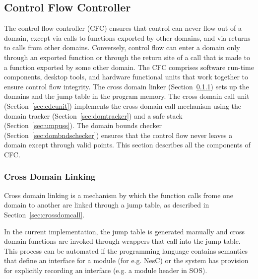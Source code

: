 \subsection{Control Flow Controller}
\label{sec:cfctrl}
%
The control flow controller (CFC) ensures that control can never flow out of
a domain, except via calls to functions exported by other domains, and
via returns to calls from other domains.
%
Conversely, control flow can enter a domain only through an exported
function or through the return site of a call that is made to a
function exported by some other domain.
%
%
The CFC comprises software run-time components, desktop tools, and
hardware functional units that work together to ensure control flow
integrity.
%
The cross domain linker (Section~\ref{sec:cross_domain_linking}) sets up the domains and the jump table in the program memory.
%
The cross domain call unit (Section~\ref{sec:cdcunit}) implements the
cross domain call mechanism using the domain tracker
(Section~\ref{sec:domtracker}) and a safe stack
(Section~\ref{sec:umpuss}).
%
The domain bounds checker (Section~\ref{sec:dombndschecker}) ensures
that the control flow never leaves a domain except through valid
points.
%
This section describes all the components of CFC.
\subsubsection{Cross Domain Linking}
\label{sec:cross_domain_linking}
%
Cross domain linking is a mechanism by which the function calls frome
one domain to another are linked through a jump table,
%
as described in Section~\ref{sec:crossdomcall}.
%
%
%


%
In the current implementation, the jump table is generated manually
and cross domain functions are invoked through wrappers that
call into the jump table.
%
This process can be automated if the programming language
contains semantics that define an interface for a module (for
e.g. NesC) or the system has provision for explicitly recording an interface
(e.g. a module header in SOS).
%
%
%
%
